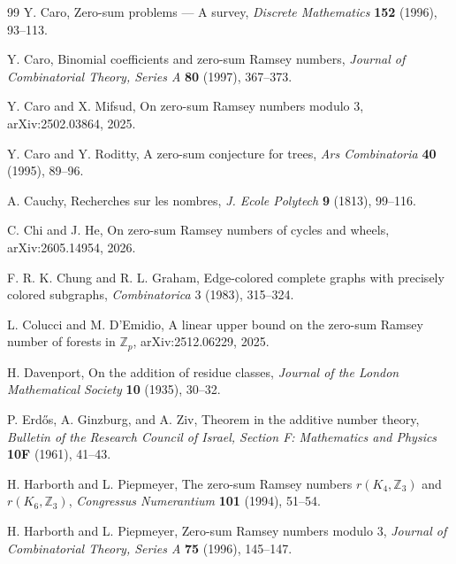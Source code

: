 ﻿\documentclass[11pt]{article}
\numberwithin{equation}{section}
\theoremstyle{remark}
\begin{document}
\begin{thebibliography}{99}
    Y. Caro,
    \newblock Zero-sum problems --- A survey,
    \newblock \emph{Discrete Mathematics} \textbf{152} (1996), 93--113.

    Y. Caro,
    \newblock Binomial coefficients and zero-sum Ramsey numbers,
    \newblock \emph{Journal of Combinatorial Theory, Series A} \textbf{80}
    (1997), 367--373.

    Y. Caro and X. Mifsud,
    \newblock On zero-sum Ramsey numbers modulo \(3\),
    \newblock arXiv:2502.03864, 2025.

    Y. Caro and Y. Roditty,
    \newblock A zero-sum conjecture for trees,
    \newblock \emph{Ars Combinatoria} \textbf{40} (1995), 89--96.

    A. Cauchy,
    \newblock Recherches sur les nombres,
    \newblock \emph{J. Ecole Polytech} \textbf{9} (1813), 99--116.

    C. Chi and J. He,
    \newblock On zero-sum Ramsey numbers of cycles and wheels,
    \newblock arXiv:2605.14954, 2026.

    F. R. K. Chung and R. L. Graham,
    \newblock Edge-colored complete graphs with precisely colored subgraphs,
    \newblock \emph{Combinatorica} 3 (1983), 315--324.

    L. Colucci and M. D'Emidio,
    \newblock A linear upper bound on the zero-sum Ramsey number of forests in \(\mathbb Z_p\),
    \newblock arXiv:2512.06229, 2025.

    H. Davenport,
    \newblock On the addition of residue classes,
    \newblock \emph{Journal of the London Mathematical Society} \textbf{10} (1935), 30--32.

    P. Erd\H{o}s, A. Ginzburg, and A. Ziv,
    \newblock Theorem in the additive number theory,
    \newblock \emph{Bulletin of the Research Council of Israel, Section F: Mathematics and Physics} \textbf{10F} (1961), 41--43.

    H. Harborth and L. Piepmeyer,
    \newblock The zero-sum Ramsey numbers \(r(K_4,\mathbb Z_3)\) and
    \(r(K_6,\mathbb Z_3)\),
    \newblock \emph{Congressus Numerantium} \textbf{101} (1994), 51--54.

    H. Harborth and L. Piepmeyer,
    \newblock Zero-sum Ramsey numbers modulo \(3\),
    \newblock \emph{Journal of Combinatorial Theory, Series A} \textbf{75}
    (1996), 145--147.


\end{thebibliography}
\end{document}
